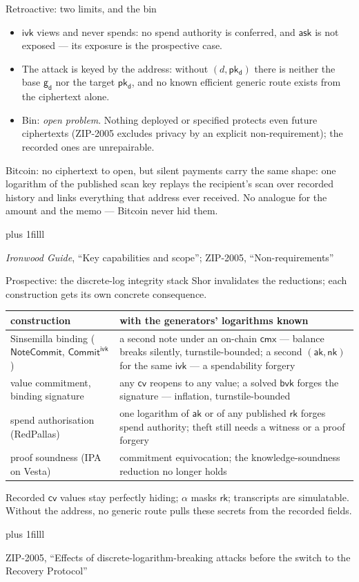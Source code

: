 \documentclass[aspectratio=169,11pt]{beamer}
\newcommand{\cmx}{\ensuremath{\mathsf{cmx}}}
\newcommand{\cvsym}{\ensuremath{\mathsf{cv}}}
\newcommand{\rksym}{\ensuremath{\mathsf{rk}}}
\newcommand{\gd}{\ensuremath{\mathsf{g_d}}}
\newcommand{\pkd}{\ensuremath{\mathsf{pk_d}}}
\newcommand{\aksym}{\ensuremath{\mathsf{ak}}}
\newcommand{\nksym}{\ensuremath{\mathsf{nk}}}
\newcommand{\asksym}{\ensuremath{\mathsf{ask}}}
\newcommand{\ivk}{\ensuremath{\mathsf{ivk}}}
\newcommand{\NoteCommit}{\ensuremath{\mathsf{NoteCommit}}}
\newcommand{\CommitIvk}{\ensuremath{\mathsf{Commit}^{\mathsf{ivk}}}}
\newcommand{\src}[1]{\par\vskip0pt plus 1filll
  {\fontsize{6}{7.2}\selectfont\color{arbdim}\raggedright #1\par}}
\begin{document}
\begin{frame}{Retroactive: two limits, and the bin}
\begin{itemize}
  \item \ivk{} views and never spends: no spend authority is conferred,
    and \asksym{} is not exposed --- its exposure is the prospective case.
  \item The attack is keyed by the address: without $(d, \pkd)$ there is
    neither the base \gd{} nor the target \pkd, and no known efficient
    generic route exists from the ciphertext alone.
  \item Bin: \emph{open problem}. Nothing deployed or specified protects
    even future ciphertexts (ZIP-2005 excludes privacy by an explicit
    non-requirement); the recorded ones are unrepairable.
\end{itemize}
\alert{Bitcoin:} no ciphertext to open, but silent payments carry the same
shape: one logarithm of the published scan key replays the recipient's
scan over recorded history and links everything that address ever
received. No analogue for the amount and the memo --- Bitcoin never hid
them.
\src{\emph{Ironwood Guide}, ``Key capabilities and scope''; ZIP-2005,
  ``Non-requirements''}
\end{frame}

\begin{frame}{Prospective: the discrete-log integrity stack}
Shor invalidates the reductions; each construction gets its own concrete
consequence.
\begin{center}\small
\begin{tabular}{@{}p{}p{}@{}}
\toprule
construction & with the generators' logarithms known \\
\midrule
\raggedright Sinsemilla binding (\NoteCommit, \CommitIvk) & a second note
  under an on-chain \cmx{} --- balance breaks silently,
  turnstile-bounded; a second $(\aksym, \nksym)$ for the same \ivk{} ---
  a spendability forgery \\
\raggedright value commitment, binding signature & any \cvsym{} reopens to any
  value; a solved $\mathsf{bvk}$ forges the signature --- inflation,
  turnstile-bounded \\
\raggedright spend authorisation (RedPallas) & one logarithm of \aksym{} or
  of any
  published \rksym{} forges spend authority; theft still needs a
  witness or a proof forgery \\
\raggedright proof soundness (IPA on Vesta) & commitment equivocation; the
  knowledge-soundness reduction no longer holds \\
\bottomrule
\end{tabular}
\end{center}
Recorded \cvsym{} values stay perfectly hiding; $\alpha$ masks \rksym;
transcripts are simulatable. Without the address, no generic route pulls
these secrets from the recorded fields.
\src{ZIP-2005, ``Effects of discrete-logarithm-breaking attacks before the
  switch to the Recovery Protocol''}
\end{frame}
\end{document}
